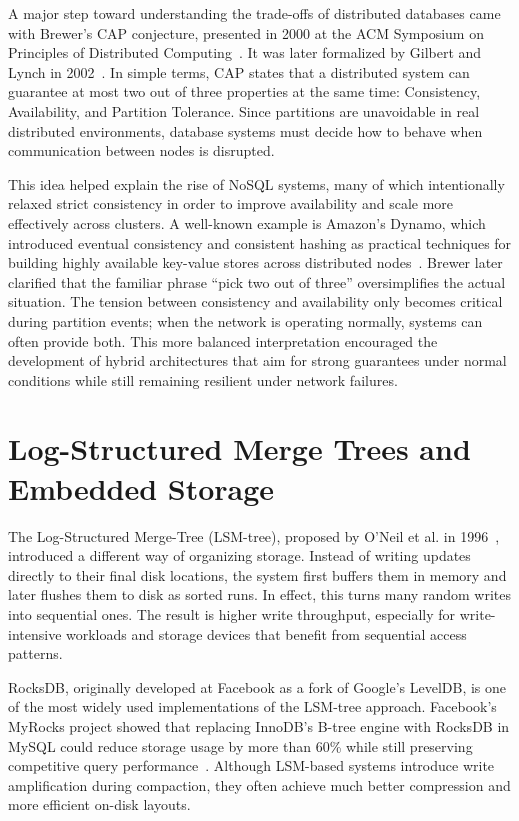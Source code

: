 A major step toward understanding the trade-offs of distributed databases came with Brewer’s CAP conjecture, presented in 2000 at the ACM Symposium on Principles of Distributed Computing~\cite{brewer2000}. It was later formalized by Gilbert and Lynch in 2002~\cite{gilbert2002}. In simple terms, CAP states that a distributed system can guarantee at most two out of three properties at the same time: Consistency, Availability, and Partition Tolerance. Since partitions are unavoidable in real distributed environments, database systems must decide how to behave when communication between nodes is disrupted.

This idea helped explain the rise of NoSQL systems, many of which intentionally relaxed strict consistency in order to improve availability and scale more effectively across clusters. A well-known example is Amazon’s Dynamo, which introduced eventual consistency and consistent hashing as practical techniques for building highly available key-value stores across distributed nodes~\cite{decandia2007}. Brewer later clarified that the familiar phrase ``pick two out of three'' oversimplifies the actual situation. The tension between consistency and availability only becomes critical during partition events; when the network is operating normally, systems can often provide both. This more balanced interpretation encouraged the development of hybrid architectures that aim for strong guarantees under normal conditions while still remaining resilient under network failures.

\section{Log-Structured Merge Trees and Embedded Storage}

The Log-Structured Merge-Tree (LSM-tree), proposed by O'Neil et al. in 1996~\cite{oneil1996}, introduced a different way of organizing storage. Instead of writing updates directly to their final disk locations, the system first buffers them in memory and later flushes them to disk as sorted runs. In effect, this turns many random writes into sequential ones. The result is higher write throughput, especially for write-intensive workloads and storage devices that benefit from sequential access patterns.

RocksDB, originally developed at Facebook as a fork of Google’s LevelDB, is one of the most widely used implementations of the LSM-tree approach. Facebook’s MyRocks project showed that replacing InnoDB’s B-tree engine with RocksDB in MySQL could reduce storage usage by more than 60\% while still preserving competitive query performance~\cite{matsunobu2020}. Although LSM-based systems introduce write amplification during compaction, they often achieve much better compression and more efficient on-disk layouts.

